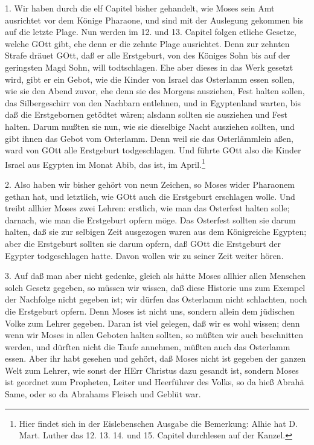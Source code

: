 1. Wir haben durch die elf Capitel bisher gehandelt, wie Moses sein Amt ausrichtet vor dem Könige Pharaone, und sind mit der Auslegung gekommen bis auf die letzte Plage. Nun werden im 12. und 13. Capitel folgen etliche Gesetze, welche GOtt gibt, ehe denn er die zehnte Plage ausrichtet. Denn zur zehnten Strafe dräuet GOtt, daß er alle Erstgeburt, von des Königes Sohn bis auf der geringsten Magd Sohn, will todtschlagen. Ehe aber dieses in das Werk gesetzt wird, gibt er ein Gebot, wie die Kinder von Israel das Osterlamm essen sollen, wie sie den Abend zuvor, ehe denn sie des Morgens ausziehen, Fest halten sollen, das Silbergeschirr von den Nachbarn entlehnen, und in Egyptenland warten, bis daß die Erstgebornen getödtet wären; alsdann sollten sie ausziehen und Fest halten. Darum mußten sie nun, wie sie dieselbige Nacht ausziehen sollten, und gibt ihnen das Gebot vom Osterlamm. Denn weil sie das Osterlämmlein aßen, ward von GOtt
alle Erstgeburt todgeschlagen. Und führte GOtt also die Kinder Israel aus Egypten im Monat Abib, das ist, im April.\footnote{Hier findet sich in der Eislebenschen Ausgabe die Bemerkung: Alhie hat D. Mart. Luther das 12. 13. 14. und 15. Capitel durchlesen auf der Kanzel.}

2. Also haben wir bisher gehört von neun Zeichen, so Moses wider Pharaonem gethan hat, und letztlich, wie GOtt auch die Erstgeburt erschlagen wolle. Und treibt allhier Moses zwei Lehren: erstlich, wie man das Osterfest halten solle; darnach, wie man die Erstgeburt opfern möge. Das Osterfest sollten sie darum halten, daß sie zur selbigen Zeit ausgezogen waren aus dem Königreiche Egypten; aber die Erstgeburt sollten sie darum opfern, daß GOtt die Erstgeburt der Egypter todgeschlagen hatte. Davon wollen wir zu seiner Zeit weiter hören.

3. Auf daß man aber nicht gedenke, gleich als hätte Moses allhier allen Menschen solch Gesetz gegeben, so müssen wir wissen, daß diese Historie uns zum Exempel der Nachfolge nicht gegeben ist; wir dürfen das Osterlamm nicht schlachten, noch die Erstgeburt opfern. Denn Moses ist nicht uns, sondern allein dem jüdischen Volke zum Lehrer gegeben. Daran ist viel gelegen, daß wir es wohl wissen; denn wenn wir Moses in allen Geboten halten sollten, so müßten wir auch beschnitten werden, und dürften nicht die Taufe annehmen, müßten auch das Osterlamm essen. Aber ihr habt gesehen und gehört, daß Moses nicht ist gegeben der ganzen Welt zum Lehrer, wie sonst der HErr Christus dazu gesandt ist, sondern Moses ist geordnet zum Propheten, Leiter und Heerführer des Volks, so da hieß Abrahä Same, oder so da Abrahams Fleisch und Geblüt war.

